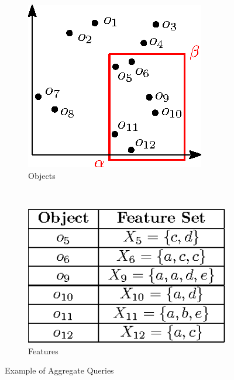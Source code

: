 \begin{figure}[t]
  \centering
  \begin{subfigure}[b]{.5\linewidth}
    \centering
    \includegraphics[width=.7\linewidth]{figs/aggregate-queries/example-object.eps}
    \caption{Objects}\label{fig:aggregate-queries:example:object}
  \end{subfigure}~%
  \begin{subfigure}[b]{.5\linewidth}
    \centering
    \includegraphics[width=.9\linewidth]{figs/aggregate-queries/example-feature.eps}
    \caption{Features}\label{fig:aggregate-queries:example:feature}
  \end{subfigure}
  \caption{Example of Aggregate Queries}\label{fig:aggregate-queries:example}
\end{figure}

